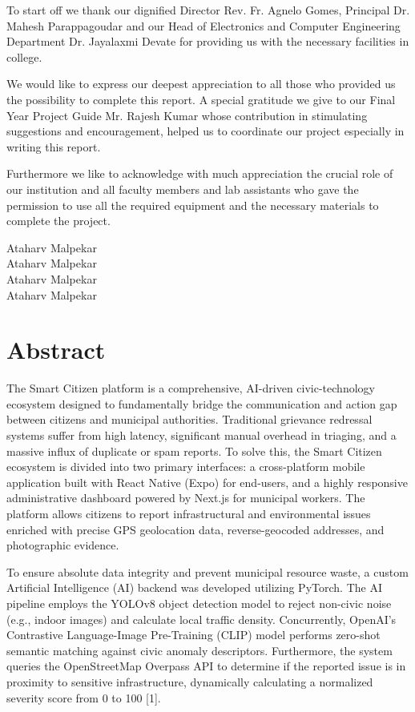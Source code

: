 \documentclass[12pt,a4paper]{report}
\begin{document}
To start off we thank our dignified Director Rev. Fr. Agnelo Gomes, Principal Dr. Mahesh Parappagoudar and our Head of Electronics and Computer Engineering Department Dr. Jayalaxmi Devate for providing us with the necessary facilities in college.

We would like to express our deepest appreciation to all those who provided us the possibility to complete this report. A special gratitude we give to our Final Year Project Guide Mr. Rajesh Kumar whose contribution in stimulating suggestions and encouragement, helped us to coordinate our project especially in writing this report.

Furthermore we like to acknowledge with much appreciation the crucial role of our institution and all faculty members and lab assistants who gave the permission to use all the required equipment and the necessary materials to complete the project.

\vspace{2cm}
\begin{flushright}
Ataharv Malpekar\\
Ataharv Malpekar\\
Ataharv Malpekar\\
Ataharv Malpekar
\end{flushright}
\newpage

\chapter*{Abstract}
The Smart Citizen platform is a comprehensive, AI-driven civic-technology ecosystem designed to fundamentally bridge the communication and action gap between citizens and municipal authorities. Traditional grievance redressal systems suffer from high latency, significant manual overhead in triaging, and a massive influx of duplicate or spam reports. To solve this, the Smart Citizen ecosystem is divided into two primary interfaces: a cross-platform mobile application built with React Native (Expo) for end-users, and a highly responsive administrative dashboard powered by Next.js for municipal workers. The platform allows citizens to report infrastructural and environmental issues enriched with precise GPS geolocation data, reverse-geocoded addresses, and photographic evidence. 

To ensure absolute data integrity and prevent municipal resource waste, a custom Artificial Intelligence (AI) backend was developed utilizing PyTorch. The AI pipeline employs the YOLOv8 object detection model to reject non-civic noise (e.g., indoor images) and calculate local traffic density. Concurrently, OpenAI's Contrastive Language-Image Pre-Training (CLIP) model performs zero-shot semantic matching against civic anomaly descriptors. Furthermore, the system queries the OpenStreetMap Overpass API to determine if the reported issue is in proximity to sensitive infrastructure, dynamically calculating a normalized severity score from 0 to 100 [1]. 
\end{document}
